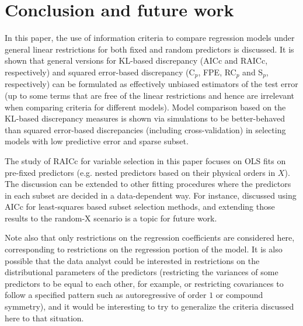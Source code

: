\section{Conclusion and future work}
\label{sec:conclusion}
In this paper, the use of information criteria to compare regression models under general linear restrictions for both fixed and random predictors is discussed. It is shown that general versions for KL-based discrepancy (AICc and RAICc, respectively) and squared error-based discrepancy (C$_p$, FPE, RC$_p$ and S$_p$, respectively) can be formulated as effectively unbiased estimators of the test error (up to some terms that are free of the linear restrictions and hence are irrelevant when comparing criteria for different models). Model comparison based on the KL-based discrepancy measures is shown via simulations to be better-behaved than squared error-based discrepancies (including cross-validation) in selecting models with low predictive error and sparse subset.

The study of RAICc for variable selection in this paper focuses on OLS fits on pre-fixed predictors (e.g. nested predictors based on their physical orders in $X$). The discussion can be extended to other fitting procedures where the predictors in each subset are decided in a data-dependent way. For instance, \citet{tian2019use} discussed using AICc for least-squares based subset selection methods, and extending those results to the random-X scenario is a topic for future work. 

Note also that only restrictions on the regression coefficients are considered here, corresponding to restrictions on the regression portion of the model. It is also possible that the data analyst could be interested in restrictions on the distributional parameters of the predictors (restricting the variances of some predictors to be equal to each other, for example, or restricting covariances to follow a specified pattern such as autoregressive of order $1$ or compound symmetry), and it would be interesting to try to generalize the criteria discussed here to that situation.